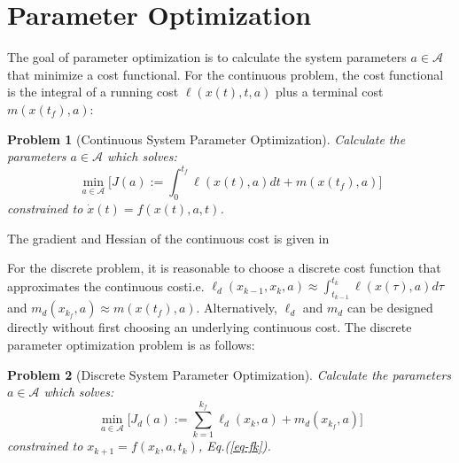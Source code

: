 \documentclass[letterpaper, 10pt, conference]{ieeeconf}
\newtheorem{problem}{Problem}
\begin{document}

\section{Parameter Optimization}
The goal of parameter optimization is to calculate the system parameters $a\in\mathcal{A}$ that minimize a cost functional.  For the continuous problem, the cost functional is the integral of a running cost $\ell(x(t),t,a)$ plus a terminal cost $m(x(t_f),a)$:
\begin{problem}[Continuous System Parameter Optimization]
Calculate the parameters $a\in\mathcal{A}$ which solves:
\[
\min_{a\in\mathcal{A}} \Big[J(a):=\int_0^{t_f}\ell(x(t),a)dt + m(x(t_f),a)\Big]
\]
constrained to $\dot{x}(t) = f(x(t),a,t)$.
\end{problem}
The gradient and Hessian of the continuous cost is given in \cite{miller_murphey}

For the discrete problem, it is reasonable to choose a discrete cost function that approximates the continuous cost\textemdash i.e. $\ell_d(x_{k-1},x_{k},a)\approx\int_{t_{k-1}}^{t_{k}}\ell(x(\tau),a)d\tau$ and $m_d(x_{k_f},a)\approx m(x(t_f),a)$.  Alternatively, $\ell_d$ and $m_d$ can be designed directly without first choosing an underlying continuous cost.  The discrete parameter optimization problem is as follows:
\begin{problem}[Discrete System Parameter Optimization]
Calculate the parameters $a\in\mathcal{A}$ which solves:
\[
\min_{a\in\mathcal{A}} \Big[J_d(a):=\sum_{k=1}^{k_f}\ell_d(x_k,a) + m_d(x_{k_f},a)\Big]
\]
constrained to $x_{k+1} = f(x_k,a,t_k)$, Eq.(\ref{eq-fk}).
\label{prob-disc}
\end{problem}
\end{document}
